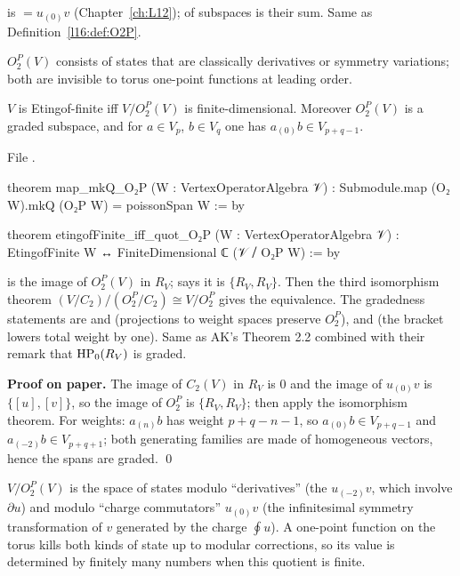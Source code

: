 \begin{dictionary}
 is  $=u_{(0)}v$ (Chapter~\ref{ch:L12});  of subspaces is
their sum. Same as Definition~\ref{l16:def:O2P}.
\end{dictionary}

\begin{physics}
$O_2^P(V)$ consists of states that are classically derivatives or symmetry variations; both are invisible to torus
one-point functions at leading order.
\end{physics}

\begin{theorem}\label{l16:thm:O2P}
$V$ is Etingof-finite iff $V/O_2^P(V)$ is finite-dimensional. Moreover $O_2^P(V)$ is a graded subspace, and
for $a\in V_p$, $b\in V_q$ one has $a_{(0)}b\in V_{p+q-1}$.
\end{theorem}
\noindent File .
\begin{leancode}
theorem map_mkQ_O₂P (W : VertexOperatorAlgebra 𝒱) :
    Submodule.map (O₂ W).mkQ (O₂P W) = poissonSpan W := by

theorem etingofFinite_iff_quot_O₂P (W : VertexOperatorAlgebra 𝒱) :
    EtingofFinite W ↔ FiniteDimensional ℂ (𝒱 ⧸ O₂P W) := by
\end{leancode}

\begin{dictionary}
\allowbreak{}\allowbreak{} is the image of $O_2^P(V)$ in $R_V$;  says it is
$\{R_V,R_V\}$. Then the third isomorphism theorem $(V/C_2)/(O_2^P/C_2)\cong V/O_2^P$ gives the equivalence.
The gradedness statements are  and  (projections to weight
spaces preserve $O_2^P$), and  (the bracket lowers total weight by one). Same as AK's
Theorem 2.2 combined with their remark that $\mathrm{HP}_0(R_V)$ is graded.
\end{dictionary}

\textbf{Proof on paper.} The image of $C_2(V)$ in $R_V$ is $0$ and the image of $u_{(0)}v$ is $\{[u],[v]\}$,
so the image of $O_2^P$ is $\{R_V,R_V\}$; then apply the isomorphism theorem. For weights: $a_{(n)}b$ has
weight $p+q-n-1$, so $a_{(0)}b\in V_{p+q-1}$ and $a_{(-2)}b\in V_{p+q+1}$; both generating families are made of
homogeneous vectors, hence the spans are graded. \qed

\begin{physics}
$V/O_2^P(V)$ is the space of states modulo ``derivatives'' (the $u_{(-2)}v$, which involve $\partial u$) and
modulo ``charge commutators'' $u_{(0)}v$ (the infinitesimal symmetry transformation of $v$ generated by the charge
$\oint u$). A one-point function on the torus kills both kinds of state up to modular corrections, so its value is
determined by finitely many numbers when this quotient is finite.
\end{physics}

